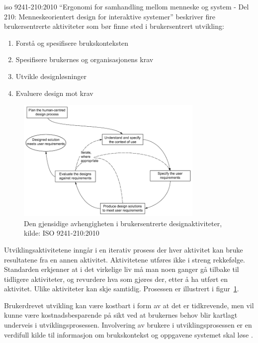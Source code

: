 \acrshort{iso} 9241-210:2010 “Ergonomi for samhandling mellom menneske og system - Del 210: Menneskeorientert design for interaktive systemer” beskriver fire brukersentrerte aktiviteter som bør finne sted i brukersentrert utvikling:
\begin{enumerate}
\item Forstå og spesifisere brukskonteksten
\item Spesifisere brukernes og organisasjonens krav
\item Utvikle designløsninger
\item Evaluere design mot krav
\end{enumerate}

\begin{figure}[H]
    \centering
    \includegraphics[width=0.8\textwidth]{fig/bakgrunn/ISO9241-210.PNG}
    \caption{Den gjensidige avhengigheten i brukersentrerte designaktiviteter, kilde: ISO 9241-210:2010 }
    \label{fig:ISO9241}
\end{figure}

Utviklingsaktivitetene inngår i en iterativ prosess der hver aktivitet kan bruke resultatene fra en annen aktivitet. Aktivitetene utføres ikke i streng rekkefølge. Standarden erkjenner at i det virkelige liv må man noen ganger gå tilbake til tidligere aktiviteter, og revurdere hva som gjøres der, etter å ha utført en aktivitet. Ulike aktiviteter kan skje samtidig. Prosessen er illustrert i figur~\ref{fig:ISO9241}.

Brukerdrevet utvikling kan være kostbart i form av at det er tidkrevende, men vil kunne være kostnadsbesparende på sikt ved at brukernes behov blir kartlagt underveis i utviklingsprosessen. Involvering av brukere i utviklingsprosessen er en verdifull kilde til informasjon om brukskontekst og oppgavene systemet skal løse \citep{usercentereddesign}.


